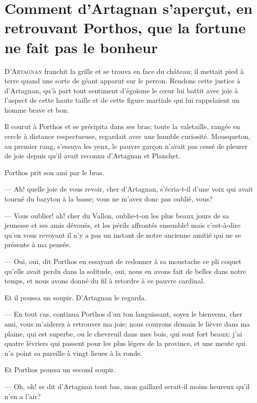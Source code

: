 \chapter[La fortune ne fait pas le bonheur]{Comment d'Artagnan s'aperçut, en retrouvant Porthos, que la fortune ne fait pas le bonheur}

\lettrine{D}{'Artagnan} franchit la grille et se trouva en face du château; il mettait pied à terre quand une sorte de géant apparut sur le perron. Rendons cette justice à d'Artagnan, qu'à part tout sentiment d'égoïsme le cœur lui battit avec joie à l'aspect de cette haute taille et de cette figure martiale qui lui rappelaient un homme brave et bon.

Il courut à Porthos et se précipita dans ses bras; toute la valetaille, rangée en cercle à distance respectueuse, regardait avec une humble curiosité. Mousqueton, au premier rang, s'essuya les yeux, le pauvre garçon n'avait pas cessé de pleurer de joie depuis qu'il avait reconnu d'Artagnan et Planchet.

Porthos prit son ami par le bras.

— Ah! quelle joie de vous revoir, cher d'Artagnan, s'écria-t-il d'une voix qui avait tourné du baryton à la basse; vous ne m'avez donc pas oublié, vous?

— Vous oublier! ah! cher du Vallon, oublie-t-on les plus beaux jours de sa jeunesse et ses amis dévoués, et les périls affrontés ensemble! mais c'est-à-dire qu'en vous revoyant il n'y a pas un instant de notre ancienne amitié qui ne se présente à ma pensée.

— Oui, oui, dit Porthos en essayant de redonner à sa moustache ce pli coquet qu'elle avait perdu dans la solitude, oui, nous en avons fait de belles dans notre temps, et nous avons donné du fil à retordre à ce pauvre cardinal.

Et il poussa un soupir. D'Artagnan le regarda.

— En tout cas, continua Porthos d'un ton languissant, soyez le bienvenu, cher ami, vous m'aiderez à retrouver ma joie; nous courrons demain le lièvre dans ma plaine, qui est superbe, ou le chevreuil dans mes bois, qui sont fort beaux: j'ai quatre lévriers qui passent pour les plus légers de la province, et une meute qui n'a point sa pareille à vingt lieues à la ronde.

Et Porthos poussa un second soupir.

— Oh, oh! se dit d'Artagnan tout bas, mon gaillard serait-il moins heureux qu'il n'en a l'air?

